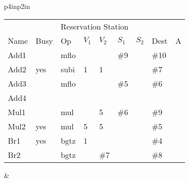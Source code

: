 \begin{tabular}{p{4in}p{2in}}
\noindent
\begin{tabular}{lllllllll}
\multicolumn{9}{c}{Reservation Station} \\
Name & Busy & Op   & $V_1$ & $V_2$ & $S_1$ & $S_2$ & Dest & A \\ \hline
Add1 &      & mflo &       &       & \#9   &       & \#10 &   \\
Add2 & yes  & subi & 1     & 1     &       &       & \#7  &   \\
Add3 &      & mflo &       &       & \#5   &       & \#6  &   \\
Add4 &      &      &       &       &       &       &      &   \\ \hline
Mul1 &      & mul  &       & 5     & \#6   &       & \#9  &   \\
Mul2 & yes  & mul  & 5     & 5     &       &       & \#5  &   \\ \hline
Br1  & yes  & bgtz & 1     &       &       &       & \#4  &   \\
Br2  &      & bgtz &       & \#7   &       &       & \#8  &   \\
\end{tabular} &  \\
\end{tabular}






